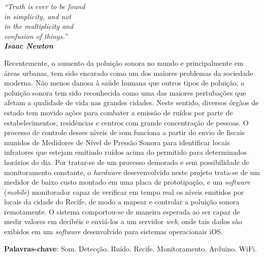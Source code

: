 \documentclass[
    12pt,               %
    openright,          %
    oneside,
    a4paper,            
    english,            %
    brazil              %
    ]{abntex2}
\begin{document}
\begin{epigrafe}
    \vspace*{\fill}
    \begin{flushright}
        \textit{``Truth is ever to be found  \\
                  in simplicity, and not \\ in the multiplicity 
                  and \\ confusion of things.''\\
        \textbf{Isaac Newton}}
    \end{flushright}
\end{epigrafe}


\setlength{\absparsep}{18pt} %
\begin{resumo}

Recentemente, o aumento da poluição sonora no mundo e principalmente em áreas urbanas, tem sido encarado como um dos maiores problemas da sociedade moderna. Não menos danosa à saúde humana que outros tipos de poluição, a poluição sonora tem sido reconhecida como uma das maiores pertubações que afetam a qualidade de vida nas grandes cidades. Neste sentido, diversos órgãos de estado tem movido ações para combater a emissão de ruídos por parte de estabelecimentos, residências e centros com grande concentração de pessoas. O processo de controle desses níveis de som funciona a partir do envio de fiscais munidos de Medidores de Nível de Pressão Sonora para identificar locais infratores que estejam emitindo ruídos acima do permitido para determinados horários do dia. Por tratar-se de um processo demorado e sem possibilidade de monitoramento constante, o \textit{hardware} desevenvolvido neste projeto trata-se de um medidor de baixo custo montado em uma placa de prototipação, e um \textit{software} (\textit{mobile}) monitorador capaz de verificar em tempo real os níveis emitidos por locais da cidade do Recife, de modo a mapear e controlar a poluição sonora remotamente. O sistema comportou-se de maneira esperada ao ser capaz de medir valores em decibéis e enviá-los a um servidor \textit{web}, onde tais dados são exibidos em um \textit{software} desenvolvido para sistemas operacionais iOS.

 \textbf{Palavras-chave}: Som. Detecção. Ruído. Recife. Monitoramento. Arduino. WiFi.
\end{resumo}
\end{document}
